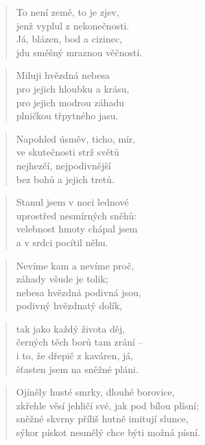 \documentclass{book}
\begin{document}
\begin{verse}
To není země, to je zjev,\\
jenž vyplul z nekonečnosti.\\
Já, blázen, bod a cizinec,\\
jdu směšný mraznou věčností.
\end{verse}
\newpage
{}
\begin{verse}
\large{}
\end{verse}
\begin{verse}
Miluji hvězdná nebesa\\
pro jejich hloubku a krásu,\\
pro jejich modrou záhadu\\
plničkou třpytného jasu.
\end{verse}
\begin{verse}
Napohled úsměv, ticho, mír,\\
ve skutečnosti strž světů\\
nejhezčí, nejpodivnější\\
bez bohů a jejich tretů.
\end{verse}
\begin{verse}
Stanul jsem v noci lednové\\
uprostřed nesmírných sněhů:\\
velebnost hmoty chápal jsem\\
a v srdci pocítil něhu.
\end{verse}
\begin{verse}
\large{}
\end{verse}
\begin{verse}
Nevíme kam a nevíme proč,\\
záhady všude je tolik;\\
nebesa hvězdná podivná jsou,\\
podivný hvězdnatý dolík,
\end{verse}
\begin{verse}
tak jako každý života děj,\\
černých těch borů tam zrání --\\
i to, že dřepič z kaváren, já,\\
šťasten jsem na sněžné pláni.
\end{verse}
\newpage
{}
\begin{verse}
Ojíněly husté smrky, dlouhé borovice,\\
zkřehle věsí jehličí své, jak pod bílou plísní;\\
sněžné skvrny příliš hutně imitují slunce,\\
sýkor pískot nesmělý chce býti možná písní.
\end{verse}
\end{document}
